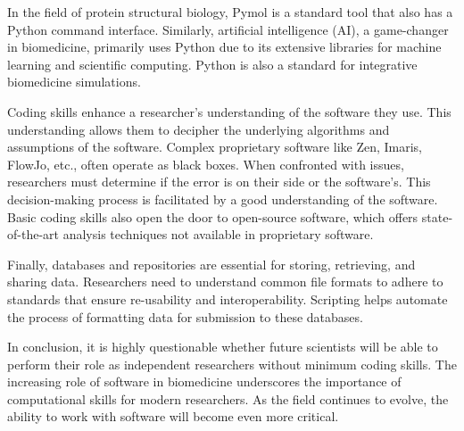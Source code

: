 In the field of protein structural biology, Pymol is a standard tool that also
has a Python command interface. Similarly, artificial intelligence (AI), a
game-changer in biomedicine, primarily uses Python due to its extensive
libraries for machine learning and scientific computing. Python is also a
standard for integrative biomedicine simulations.

Coding skills enhance a researcher's understanding of the software they use.
This understanding allows them to decipher the underlying algorithms and
assumptions of the software. Complex proprietary software like Zen, Imaris,
FlowJo, etc., often operate as black boxes. When confronted with issues,
researchers must determine if the error is on their side or the software's. This
decision-making process is facilitated by a good understanding of the software.
Basic coding skills also open the door to open-source software, which offers
state-of-the-art analysis techniques not available in proprietary software.

Finally, databases and repositories are essential for storing, retrieving, and
sharing data. Researchers need to understand common file formats to adhere to
standards that ensure re-usability and interoperability. Scripting helps
automate the process of formatting data for submission to these databases.

In conclusion, it is highly questionable whether future scientists will be able
to perform their role as independent researchers without minimum coding skills.
The increasing role of software in biomedicine underscores the importance of
computational skills for modern researchers. As the field continues to evolve,
the ability to work with software will become even more critical.






